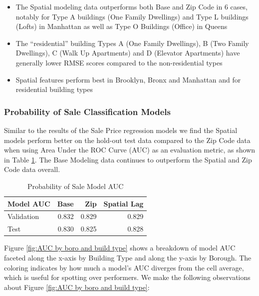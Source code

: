 \documentclass[12pt,]{article}
\providecommand{\tightlist}{%
  \setlength{\itemsep}{0pt}\setlength{\parskip}{0pt}}
\begin{document}
\begin{itemize}
\tightlist
\item
  The Spatial modeling data outperforms both Base and Zip Code in 6
  cases, notably for Type A buildings (One Family Dwellings) and Type L
  buildings (Lofts) in Manhattan as well as Type O Buildings (Office) in
  Queens
\item
  The ``residential'' building Types A (One Family Dwellings), B (Two
  Family Dwellings), C (Walk Up Apartments) and D (Elevator Apartments)
  have generally lower RMSE scores compared to the non-residential types
\item
  Spatial features perform best in Brooklyn, Bronx and Manhattan and for
  residential building types
\end{itemize}

\hypertarget{probability-of-sale-classification-models}{%
\subsubsection{Probability of Sale Classification
Models}\label{probability-of-sale-classification-models}}

Similar to the results of the Sale Price regression models we find the
Spatial models perform better on the hold-out test data compared to the
Zip Code data when using Area Under the ROC Curve (AUC) as an evaluation
metric, as shown in Table \ref{tab:ProbSaleModelAUC}. The Base Modeling
data continues to outperform the Spatial and Zip Code data overall.

\begin{table}

\caption{\label{tab:Prob Model AUC}\label{tab:ProbSaleModelAUC} Probability of Sale Model AUC}
\centering
\begin{tabular}[t]{lrrr}
\toprule
Model AUC & Base & Zip & Spatial Lag\\
\midrule
Validation & 0.832 & 0.829 & 0.829\\
Test & 0.830 & 0.825 & 0.828\\
\bottomrule
\end{tabular}
\end{table}

Figure \ref{fig:AUC by boro and build type} shows a breakdown of model
AUC faceted along the x-axis by Building Type and along the y-axis by
Borough. The coloring indicates by how much a model's AUC diverges from
the cell average, which is useful for spotting over performers. We make
the following observations about Figure
\ref{fig:AUC by boro and build type}:
\end{document}
